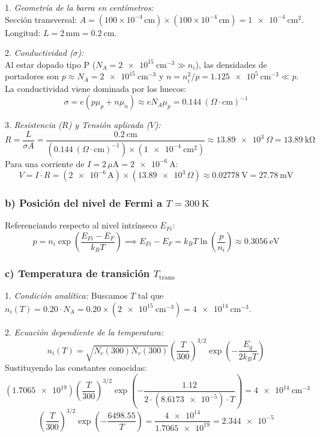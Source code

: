 \begin{problema}
1. \textit{Geometría de la barra en centímetros:}\\
Sección transversal: $A = (100 \times 10^{-4}\,\text{cm}) \times (100 \times 10^{-4}\,\text{cm}) = \SI{1e-4}{\cm^2}$.\\
Longitud: $L = 2\,\text{mm} = \SI{0.2}{\cm}$.

2. \textit{Conductividad ($\sigma$):}\\
Al estar dopado tipo P ($N_A = \SI{2e15}{\cm^{-3}} \gg n_i$), las densidades de portadores son $p \approx N_A = \SI{2e15}{\cm^{-3}}$ y $n = n_i^2 / p = \SI{1.125e5}{\cm^{-3}} \ll p$.\\
La conductividad viene dominada por los huecos:
\[
\sigma = e (p \mu_p + n \mu_n) \approx e N_A \mu_p = \SI{0.144}{(\Omega\cdot\text{cm})^{-1}}
\]

3. \textit{Resistencia ($R$) y Tensión aplicada ($V$):}\\
\[
R = \frac{L}{\sigma A} = \frac{\SI{0.2}{\cm}}{(\SI{0.144}{(\Omega\cdot\text{cm})^{-1}}) \times (\SI{1e-4}{\cm^2})} \approx \SI{13.89e3}{\Omega} = \SI{13.89}{\kilo\ohm}
\]
Para una corriente de $I = 2\,\mu\text{A} = \SI{2e-6}{\A}$:
\[
V = I \cdot R = (\num{2e-6}\,\text{A}) \times (\num{13.89e3}\,\Omega) \approx \SI{0.02778}{\V} = \SI{27.78}{\mV}
\]

\subsubsection*{b) Posición del nivel de Fermi a $T = \SI{300}{\kelvin}$}

Referenciando respecto al nivel intrínseco $E_{Fi}$:
\[
p = n_i \exp\left( \frac{E_{Fi} - E_F}{k_B T} \right) \implies E_{Fi} - E_F = k_B T \ln\left( \frac{p}{n_i} \right) \approx \SI{0.3056}{\eV}
\]

\subsubsection*{c) Temperatura de transición $T_{\text{trans}}$}

1. \textit{Condición analítica:}
Buscamos $T$ tal que $n_i(T) = 0.20 \cdot N_A = 0.20 \times (\SI{2e15}{\cm^{-3}}) = \SI{4e14}{\cm^{-3}}$.

2. \textit{Ecuación dependiente de la temperatura:}
\[
n_i(T) = \sqrt{N_c(300) N_v(300)} \left( \frac{T}{300} \right)^{3/2} \exp\left( -\frac{E_g}{2 k_B T} \right)
\]
Sustituyendo las constantes conocidas:
\[
(\num{1.7065e19}) \left( \frac{T}{300} \right)^{3/2} \exp\left( -\frac{1.12}{2 \cdot (\num{8.6173e-5}) \cdot T} \right) = \SI{4e14}{\cm^{-3}}
\]
\[
\left( \frac{T}{300} \right)^{3/2} \exp\left( -\frac{6498.55}{T} \right) = \frac{\num{4e14}}{\num{1.7065e19}} = \num{2.344e-5}
\]


\end{problema}
